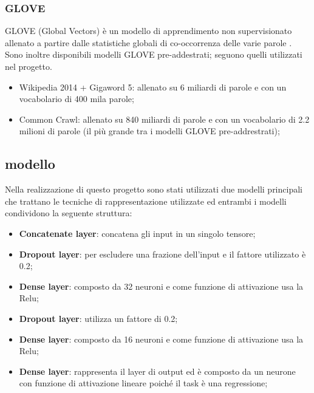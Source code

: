 


\subsubsection{GLOVE}
GLOVE (Global Vectors) è un modello di apprendimento non supervisionato allenato
a partire dalle statistiche globali di co-occorrenza delle varie parole
\cite{pennington2014glove}. Sono inoltre disponibili modelli GLOVE
pre-addestrati; seguono quelli utilizzati nel progetto.
\begin{itemize}
	\item Wikipedia 2014 + Gigaword 5: allenato su 6 miliardi di parole e con un
	vocabolario di 400 mila parole;
	\item Common Crawl: allenato su 840 miliardi di parole e con un vocabolario
	di 2.2 milioni di parole (il più grande tra i modelli GLOVE pre-addrestrati);
\end{itemize}

\subsection{modello}\label{Modello}
Nella realizzazione di questo progetto sono stati utilizzati due modelli
principali che trattano le tecniche di rappresentazione utilizzate ed  entrambi
i modelli condividono la seguente struttura:
\begin{itemize}
	\item \textbf{Concatenate layer}: concatena gli input in un singolo tensore;
	\item \textbf{Dropout layer}: per escludere una frazione dell'input e il fattore utilizzato è 0.2;
	\item \textbf{Dense layer}: composto da 32 neuroni e come funzione di attivazione usa la Relu;
	\item \textbf{Dropout layer}: utilizza un fattore di 0.2;
	\item \textbf{Dense layer}: composto da 16 neuroni e come funzione di attivazione usa la Relu;
	\item \textbf{Dense layer}: rappresenta il layer di output ed è composto da un neurone con funzione di attivazione lineare poiché il task è una regressione;
\end{itemize}
